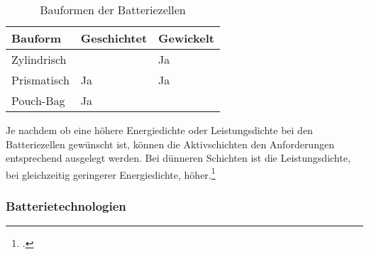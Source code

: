 \begin{table}[H]
	\caption{Bauformen der Batteriezellen}
	\label{tab:BauformenZelle}
	\vspace{0.2cm}	
	\begin{tabularx}{\textwidth}{ |X|X|X|  }
		\toprule[1.5pt]
		\textbf{Bauform} & \textbf{Geschichtet} & \textbf{Gewickelt} \\
		\hline\hline
		Zylindrisch &  & Ja\\
		\hline
		Prismatisch & Ja & Ja \\
		\hline
		Pouch-Bag & Ja &  \\
		\bottomrule[1.5pt]
	\end{tabularx}		
\end{table}

Je nachdem ob eine höhere Energiedichte oder Leistungsdichte bei den Batteriezellen gewünscht ist, können die Aktivschichten den Anforderungen entsprechend ausgelegt werden. Bei dünneren Schichten ist die Leistungsdichte, bei gleichzeitig geringerer Energiedichte, höher.\footcite[Vlg.\label{Ecker2013}][S.66-67]{Ecker2013}\\

\subsubsection*{Batterietechnologien}\label{subsub:BatTechnology}

